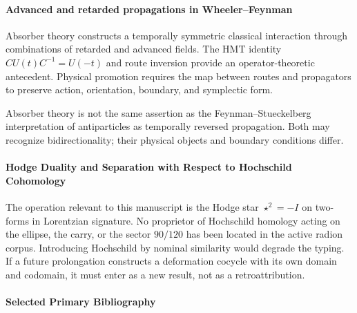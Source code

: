 \paragraph{Advanced and retarded propagations in Wheeler--Feynman}

Absorber theory constructs a temporally symmetric classical interaction
through combinations of retarded and advanced fields. The HMT
identity \(CU(t)C^{-1}=U(-t)\) and route inversion provide an
operator-theoretic antecedent. Physical promotion requires the map between routes
and propagators to preserve action, orientation, boundary, and symplectic form.

Absorber theory is not the same assertion as the Feynman--Stueckelberg
interpretation of antiparticles as temporally reversed propagation.
Both may recognize bidirectionality; their physical objects and
boundary conditions differ.

\paragraph{Hodge Duality and Separation with Respect to Hochschild Cohomology}

The operation relevant to this manuscript is the Hodge star \(\star^2=-I\) on two-forms in Lorentzian signature. No proprietor of Hochschild homology acting on the ellipse, the carry, or the sector \(90/120\) has been located in the active radion corpus. Introducing Hochschild by nominal similarity would degrade the typing. If a future prolongation constructs a deformation cocycle with its own domain and codomain, it must enter as a new result, not as a retroattribution.

\paragraph{Selected Primary Bibliography}

